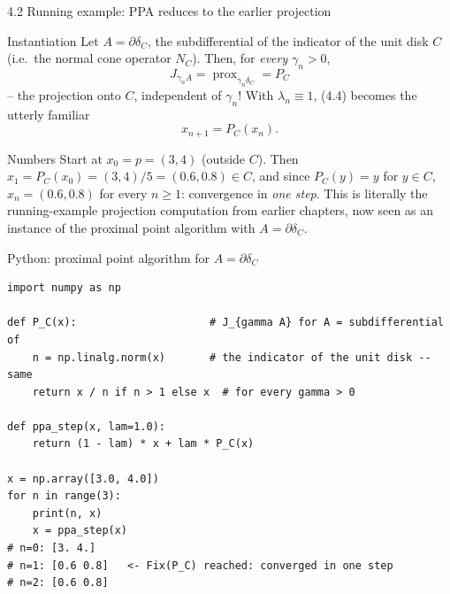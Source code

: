 \documentclass[aspectratio=169,10pt]{beamer}
\newcommand{\prox}{\operatorname{prox}}
\begin{document}
\begin{frame}{4.2 Running example: PPA reduces to the earlier projection}
  \begin{block}{Instantiation}
    Let $A=\partial\delta_C$, the subdifferential of the indicator of the unit disk $C$ (i.e.\ the normal cone operator $N_C$). Then, for \emph{every} $\gamma_n>0$,
    \[
      J_{\gamma_n A} = \prox_{\gamma_n\delta_C} = P_C
    \]
    -- the projection onto $C$, independent of $\gamma_n$! With $\lambda_n\equiv1$, (4.4) becomes the utterly familiar
    \[
      x_{n+1} = P_C(x_n).
    \]
  \end{block}
  \begin{block}{Numbers}
    Start at $x_0=p=(3,4)$ (outside $C$). Then $x_1=P_C(x_0)=(3,4)/5=(0.6,0.8)\in C$, and since $P_C(y)=y$ for $y\in C$, $x_n=(0.6,0.8)$ for every $n\ge1$: convergence in \emph{one step}. This is literally the running-example projection computation from earlier chapters, now seen as an instance of the proximal point algorithm with $A=\partial\delta_C$.
  \end{block}
\end{frame}

\begin{frame}[fragile]{Python: proximal point algorithm for $A=\partial\delta_C$}
\begin{lstlisting}
import numpy as np

def P_C(x):                     # J_{gamma A} for A = subdifferential of
    n = np.linalg.norm(x)       # the indicator of the unit disk -- same
    return x / n if n > 1 else x  # for every gamma > 0

def ppa_step(x, lam=1.0):
    return (1 - lam) * x + lam * P_C(x)

x = np.array([3.0, 4.0])
for n in range(3):
    print(n, x)
    x = ppa_step(x)
# n=0: [3. 4.]
# n=1: [0.6 0.8]   <- Fix(P_C) reached: converged in one step
# n=2: [0.6 0.8]
\end{lstlisting}
\end{frame}
\end{document}
